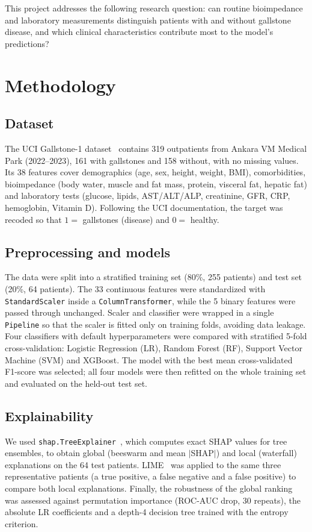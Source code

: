 \documentclass[conference]{IEEEtran}
\begin{document}
This project addresses the following research question: can routine bioimpedance and laboratory measurements distinguish patients with and without gallstone disease, and which clinical characteristics contribute most to the model's predictions?

\section{Methodology}
\subsection{Dataset}
The UCI Gallstone-1 dataset~\cite{uci} contains 319 outpatients from Ankara VM Medical Park (2022--2023), 161 with gallstones and 158 without, with no missing values. Its 38 features cover demographics (age, sex, height, weight, BMI), comorbidities, bioimpedance (body water, muscle and fat mass, protein, visceral fat, hepatic fat) and laboratory tests (glucose, lipids, AST/ALT/ALP, creatinine, GFR, CRP, hemoglobin, Vitamin D). Following the UCI documentation, the target was recoded so that $1=$ gallstones (disease) and $0=$ healthy.

\subsection{Preprocessing and models}
The data were split into a stratified training set (80\%, 255 patients) and test set (20\%, 64 patients). The 33 continuous features were standardized with \texttt{StandardScaler} inside a \texttt{ColumnTransformer}, while the 5 binary features were passed through unchanged. Scaler and classifier were wrapped in a single \texttt{Pipeline} so that the scaler is fitted only on training folds, avoiding data leakage. Four classifiers with default hyperparameters were compared with stratified 5-fold cross-validation: Logistic Regression (LR), Random Forest (RF), Support Vector Machine (SVM) and XGBoost. The model with the best mean cross-validated F1-score was selected; all four models were then refitted on the whole training set and evaluated on the held-out test set.

\subsection{Explainability}
We used \texttt{shap.TreeExplainer}~\cite{lundberg2017,lundberg2020}, which computes exact SHAP values for tree ensembles, to obtain global (beeswarm and mean $|$SHAP$|$) and local (waterfall) explanations on the 64 test patients. LIME~\cite{ribeiro2016} was applied to the same three representative patients (a true positive, a false negative and a false positive) to compare both local explanations. Finally, the robustness of the global ranking was assessed against permutation importance (ROC-AUC drop, 30 repeats), the absolute LR coefficients and a depth-4 decision tree trained with the entropy criterion.
\end{document}
